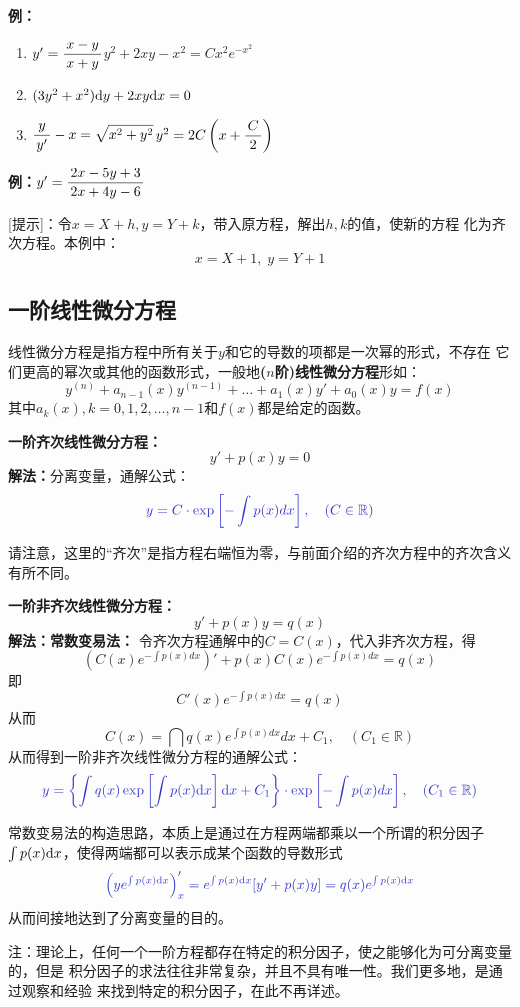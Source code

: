 {\bf 例：}
\begin{enumerate}[(1)]
  \setlength{\itemindent}{1cm}
  \item $y'=\displaystyle\frac{\,{x-y}\,}{\,{x+y}\,}$\hfill $y^2+2xy-x^2=Cx^2e^{-x^2}$
  \item $(3y^2+x^2)\mathrm{d} y+2xy\mathrm{d} x=0$
  \item $\displaystyle\frac{\,{y}\,}{\,{y'}\,}-x=\sqrt{x^2+y^2}$\hfill $y^2=2C\left(x+\displaystyle\frac{\,{C}\,}{\,{2}\,}\right)$
\end{enumerate}

{\bf 例：}$y'=\displaystyle\frac{\,{2x-5y+3}\,}{\,{2x+4y-6}\,}$

[提示]：令$x=X+h,y=Y+k$，带入原方程，解出$h,k$的值，使新的方程
化为齐次方程。本例中：
$$x=X+1,\;y=Y+1$$

\subsection{一阶线性微分方程}

线性微分方程是指方程中所有关于$y$和它的导数的项都是一次幂的形式，不存在
它们更高的幂次或其他的函数形式，一般地{\bf ($n$阶)线性微分方程}形如：
$$y^{(n)}+a_{n-1}(x)y^{(n-1)}+\ldots+a_1(x)y'+a_0(x)y=f(x)$$
其中$a_k(x),k=0,1,2,\ldots,n-1$和$f(x)$都是给定的函数。

\begin{thx}
	{\bf 一阶齐次线性微分方程：}
	$$y'+p(x)y=0$$
	{\bf 解法：}分离变量，通解公式：
	$${\b y=C\cdot\exp\left[-\int p(x)dx\right],\quad(C\in\mathbb{R})}$$
\end{thx}

请注意，这里的“齐次”是指方程右端恒为零，与前面介绍的齐次方程中的齐次含义有所不同。

\begin{thx}
	{\bf 一阶非齐次线性微分方程：}
	$$y'+p(x)y=q(x)$$
	{\bf 解法：}{\bf 常数变易法：}
	令齐次方程通解中的$C=C(x)$，代入非齐次方程，得
	$$\left(C(x)e^{-\int p(x)dx}\right)'+p(x)C(x)e^{-\int
	 p(x)dx}=q(x)$$
	即
	$$C'(x)e^{-\int p(x)dx}=q(x)$$
	从而
	$$C(x)=\dint q(x)e^{\int p(x)dx}dx+C_1,\quad(C_1\in\mathbb{R})$$ 
	从而得到一阶非齐次线性微分方程的通解公式：
	$${\b y=\left\{\int q(x)\exp\left[\int p(x)\d x\right]\d x+C_1\right\}
	\cdot\exp\left[-\int p(x)dx\right],\quad(C_1\in\mathbb{R})}$$
\end{thx}

常数变易法的构造思路，本质上是通过在方程两端都乘以一个所谓的{\kaishu 积分因子}
$\int p(x)\mathrm{d} x$，使得两端都可以表示成某个函数的导数形式
$$\b\left(ye^{\int p(x)\d x}\right)'_x=e^{\int p(x)\d x}[y'+p(x)y]
=q(x)e^{\int p(x)\d x}$$
从而间接地达到了分离变量的目的。

注：理论上，任何一个一阶方程都存在特定的积分因子，使之能够化为可分离变量的，但是
积分因子的求法往往非常复杂，并且不具有唯一性。我们更多地，是通过观察和经验
来找到特定的积分因子，在此不再详述。


